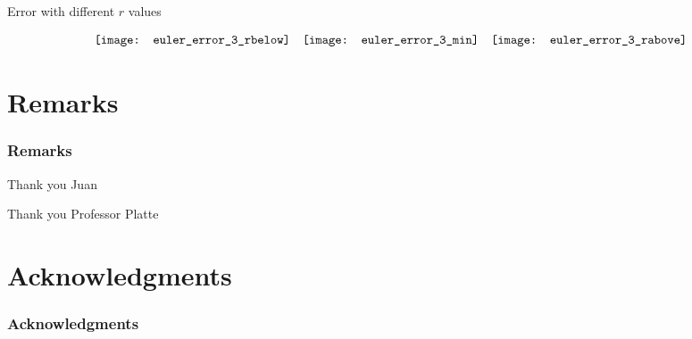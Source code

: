 \documentclass[compress]{beamer}
\begin{document}
\begin{frame}
\begin{center}
Error with different $r$ values
\end{center}
\[
\begin{array}{c c c}
\texttt{[image: euler\_error\_3\_rbelow]}	&	\texttt{[image: euler\_error\_3\_min]}	&	\texttt{[image: euler\_error\_3\_rabove]}
\end{array}
\]
\end{frame}
%
%
\section{Remarks}\label{Remarks}

\begin{frame}\frametitle{Remarks}
Thank you Juan
\vspace{.3in}

Thank you Professor Platte
\end{frame}

%
%
\section{Acknowledgments}\label{Acknowledgments}

\begin{frame}\frametitle{Acknowledgments}
\end{frame}

%
%
\end{document}
